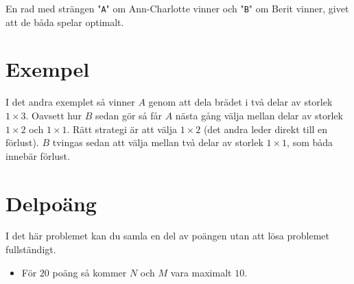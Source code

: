 En rad med strängen "\texttt{A}" om Ann-Charlotte vinner och "\texttt{B}" om
Berit vinner, givet att de båda spelar optimalt.

\section*{Exempel}
I det andra exemplet så vinner $A$ genom att dela brädet i två delar av storlek
$1 \times 3$. Oavsett hur $B$ sedan gör så får $A$ nästa gång välja mellan
delar av storlek $1 \times 2$ och $1 \times 1$. Rätt strategi är att välja $1
\times 2$ (det andra leder direkt till en förlust). $B$ tvingas sedan att välja
mellan två delar av storlek $1 \times 1$, som båda innebär förlust.

\section*{Delpoäng}

I det här problemet kan du samla en del av poängen utan att
lösa problemet fullständigt.

\begin{itemize}
    \item För $20$ poäng så kommer $N$ och $M$ vara maximalt $10$.
\end{itemize}
